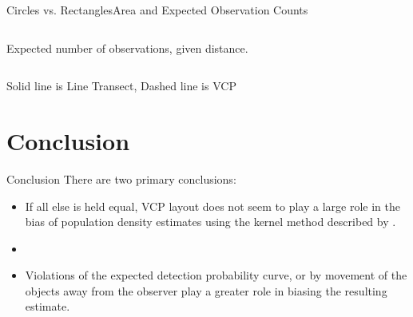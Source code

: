 \documentclass{beamer}
\begin{document}
\begin{frame}{Circles vs. Rectangles}{Area and Expected Observation Counts}
\begin{columns}
\begin{column}{0.48\textwidth}
		\small
		Expected number of observations, given distance.
		\end{column}
	\end{columns}
	\begin{center}
	\par Solid line is Line Transect, Dashed line is VCP
	\end{center}
	
\end{frame}


\section{Conclusion}

\begin{frame}{Conclusion}
There are two primary conclusions:\\
\vspace{0.5cm}
	\begin{itemize}
	\item If all else is held equal, VCP layout does not seem to play a large role in the bias of population density estimates using the kernel method described by \textcite{quang1993}.
	\item[]
	\item Violations of the expected detection probability curve, or by movement of the objects away from the observer play a greater role in biasing the resulting estimate.
	\end{itemize}

	
\end{frame}
\end{document}
